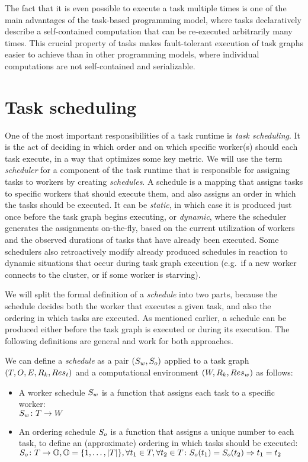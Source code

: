 The fact that it is even possible to execute a task multiple times is one of the main advantages of
the task-based programming model, where tasks declaratively describe a self-contained computation
that can be re-executed arbitrarily many times. This crucial property of tasks makes fault-tolerant
execution of task graphs easier to achieve than in other programming models, where individual
computations are not self-contained and serializable.

\section{Task scheduling}
\label{sec:task-scheduling}
One of the most important responsibilities of a task runtime is \emph{task scheduling}. It is the
act of deciding in which order and on which specific worker(s) should each task execute, in a way
that optimizes some key metric. We will use the term \emph{scheduler} for a component of the
task runtime that is responsible for assigning tasks to workers by creating
\emph{schedules}. A schedule is a mapping that assigns tasks to specific workers that should
execute them, and also assigns an order in which the tasks should be executed. It can be
\emph{static}, in which case it is produced just once before the task graph begins
executing, or \emph{dynamic}, where the scheduler generates the assignments on-the-fly,
based on the current utilization of workers and the observed durations of tasks that have already
been executed. Some schedulers also retroactively modify already produced schedules in reaction to
dynamic situations that occur during task graph execution (e.g.\ if a new worker connects to the
cluster, or if some worker is starving).

We will split the formal definition of a \emph{schedule} into two parts, because the
schedule decides both the worker that executes a given task, and also the ordering in which tasks
are executed. As mentioned earlier, a schedule can be produced either before the task graph is
executed or during its execution. The following definitions are general and work for both
approaches.

We can define a \emph{schedule} as a pair $(S_w, S_o)$ applied to a task graph
$(T, O, E, R_k, Res_t)$ and a computational environment $(W, R_k, Res_w)$ as follows:

\begin{itemize}[itemsep=0pt]
	\item A worker schedule $S_w$ is a function that assigns each task to a specific worker:
	      \\ $S_w\colon T \rightarrow W$
	\item An ordering schedule $S_o$ is a function that assigns a unique number to each
	      task, to define an (approximate) ordering in which tasks should be executed: \\
	      $S_o\colon T \rightarrow \mathbb{O}, \mathbb{O} =
		      \{1,\ldots,|T|\},
		      \forall t_1\in{}T, \forall t_2\in{}T\colon S_o(t_1) = S_o(t_2) \Rightarrow t_1 = t_2$
\end{itemize}

